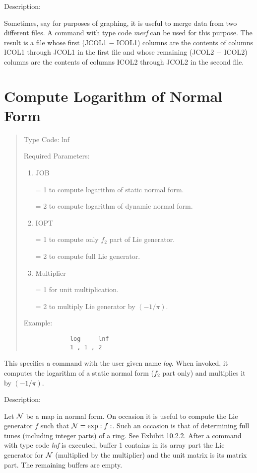 \vspace{5mm}
Description:
\vspace{2mm}

Sometimes, say for purposes of graphing, it is useful to merge data from  two different files.  A command with type code {\em merf} can be used for this purpose.  The result is a file whose first (JCOL1 $-$ ICOL1) columns are the contents of columns ICOL1 through JCOL1 in the first file and whose remaining (JCOL2 $-$ ICOL2) columns are the contents of columns ICOL2 through JCOL2 in the second file.

\newpage
\section{Compute Logarithm of Normal Form}  
\begin{quotation}
\noindent Type Code:  lnf
\vspace{5mm}

\noindent Required Parameters:
\begin{enumerate}
     \item  JOB

             = 1 to compute logarithm of static normal form.

             = 2 to compute logarithm of dynamic normal form.

     \item  IOPT

             = 1 to compute only $f_2$ part of Lie generator.

             = 2 to compute full Lie generator.

     \item  Multiplier

             = 1 for unit multiplication.

             = 2 to multiply Lie generator by $(-1/\pi )$.

\end{enumerate}

\vspace{5mm}
\noindent Example:
\vspace{2mm}
\begin{verbatim}
             log     lnf
             1 , 1 , 2
\end{verbatim}
\end{quotation}
This specifies a command with the user given name {\em log}.  When invoked, it computes the logarithm of a static normal form ($f_2$ part only) and multiplies it by $(-1/\pi )$.

\vspace{5mm}
     Description:
\vspace{2mm}

     Let ${\cal N}$ be a map in normal form.  On occasion it is useful to compute the Lie generator $f$ such that ${\cal N} = \exp :f:$.  Such an occasion is that of determining full tunes (including integer parts) of a ring.  See Exhibit 10.2.2.  After a command with type code {\em lnf} is executed, buffer 1 contains in its array part the Lie generator for ${\cal N}$  (multiplied by the multiplier) and the unit matrix is its matrix part.  The remaining buffers are empty.



